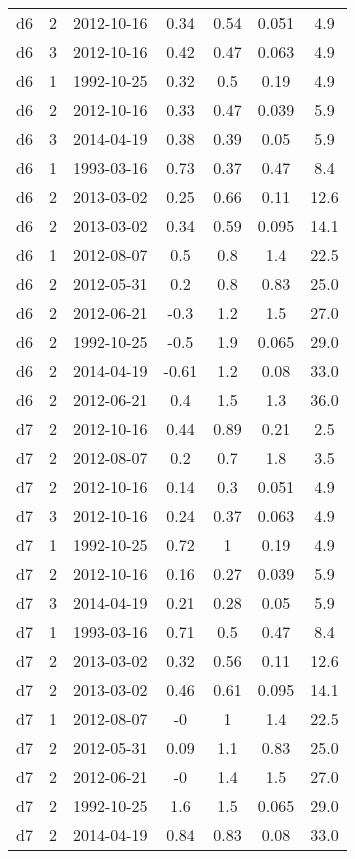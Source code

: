 \begin{table*}[htp]
\begin{tabular}{ccccccc}
d6 & 2 & 2012-10-16 & 0.34 & 0.54 & 0.051 & 4.9 \\
d6 & 3 & 2012-10-16 & 0.42 & 0.47 & 0.063 & 4.9 \\
d6 & 1 & 1992-10-25 & 0.32 & 0.5 & 0.19 & 4.9 \\
d6 & 2 & 2012-10-16 & 0.33 & 0.47 & 0.039 & 5.9 \\
d6 & 3 & 2014-04-19 & 0.38 & 0.39 & 0.05 & 5.9 \\
d6 & 1 & 1993-03-16 & 0.73 & 0.37 & 0.47 & 8.4 \\
d6 & 2 & 2013-03-02 & 0.25 & 0.66 & 0.11 & 12.6 \\
d6 & 2 & 2013-03-02 & 0.34 & 0.59 & 0.095 & 14.1 \\
d6 & 1 & 2012-08-07 & 0.5 & 0.8 & 1.4 & 22.5 \\
d6 & 2 & 2012-05-31 & 0.2 & 0.8 & 0.83 & 25.0 \\
d6 & 2 & 2012-06-21 & -0.3 & 1.2 & 1.5 & 27.0 \\
d6 & 2 & 1992-10-25 & -0.5 & 1.9 & 0.065 & 29.0 \\
d6 & 2 & 2014-04-19 & -0.61 & 1.2 & 0.08 & 33.0 \\
d6 & 2 & 2012-06-21 & 0.4 & 1.5 & 1.3 & 36.0 \\
d7 & 2 & 2012-10-16 & 0.44 & 0.89 & 0.21 & 2.5 \\
d7 & 2 & 2012-08-07 & 0.2 & 0.7 & 1.8 & 3.5 \\
d7 & 2 & 2012-10-16 & 0.14 & 0.3 & 0.051 & 4.9 \\
d7 & 3 & 2012-10-16 & 0.24 & 0.37 & 0.063 & 4.9 \\
d7 & 1 & 1992-10-25 & 0.72 & 1 & 0.19 & 4.9 \\
d7 & 2 & 2012-10-16 & 0.16 & 0.27 & 0.039 & 5.9 \\
d7 & 3 & 2014-04-19 & 0.21 & 0.28 & 0.05 & 5.9 \\
d7 & 1 & 1993-03-16 & 0.71 & 0.5 & 0.47 & 8.4 \\
d7 & 2 & 2013-03-02 & 0.32 & 0.56 & 0.11 & 12.6 \\
d7 & 2 & 2013-03-02 & 0.46 & 0.61 & 0.095 & 14.1 \\
d7 & 1 & 2012-08-07 & -0 & 1 & 1.4 & 22.5 \\
d7 & 2 & 2012-05-31 & 0.09 & 1.1 & 0.83 & 25.0 \\
d7 & 2 & 2012-06-21 & -0 & 1.4 & 1.5 & 27.0 \\
d7 & 2 & 1992-10-25 & 1.6 & 1.5 & 0.065 & 29.0 \\
d7 & 2 & 2014-04-19 & 0.84 & 0.83 & 0.08 & 33.0 \\

\end{tabular}
\end{table*}

